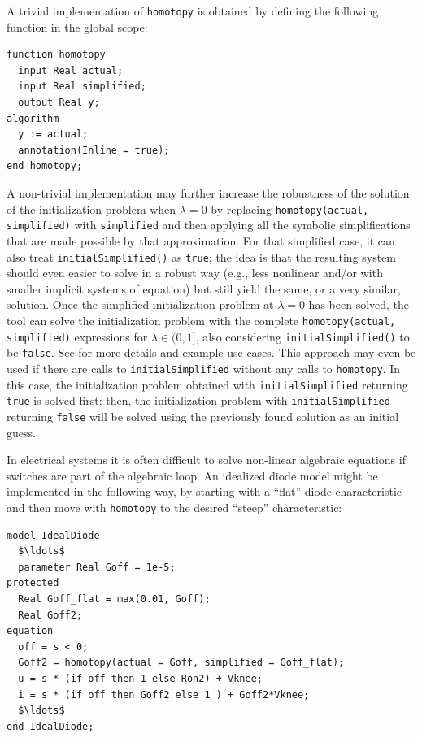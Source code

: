 \begin{nonnormative}
A trivial implementation of \lstinline!homotopy! is obtained by defining the following function in the global scope:
\begin{lstlisting}[language=modelica]
function homotopy
  input Real actual;
  input Real simplified;
  output Real y;
algorithm
  y := actual;
  annotation(Inline = true);
end homotopy;
\end{lstlisting}

A non-trivial implementation may further increase the robustness of the solution of the initialization problem when $\lambda=0$ by replacing \lstinline!homotopy(actual, simplified)! with \lstinline!simplified! and then applying all the symbolic simplifications that are made possible by that approximation.
For that simplified case, it can also treat \lstinline!initialSimplified()! as \lstinline!true!; the idea is that the resulting system should even easier to solve in a robust way (e.g., less nonlinear and/or with smaller implicit systems of equation) but still yield the same, or a very similar, solution.
Once the simplified initialization problem at $\lambda=0$ has been solved, the tool can solve the initialization problem with the complete \lstinline!homotopy(actual, simplified)! expressions for $\lambda \in (0,1]$, also considering \lstinline!initialSimplified()! to be \lstinline!false!.
See \textcite{CasellaEtAl2026InitialSimplified} for more details and example use cases.
This approach may even be used if there are calls to \lstinline!initialSimplified! without any calls to \lstinline!homotopy!.
In this case, the initialization problem obtained with \lstinline!initialSimplified! returning \lstinline!true! is solved first; then, the initialization problem with \lstinline!initialSimplified! returning \lstinline!false! will be solved using the previously found solution as an initial guess.
\end{nonnormative}

\begin{example}[1]
In electrical systems it is often difficult to solve non-linear algebraic equations if switches are part of the algebraic loop.
An idealized diode model might be implemented in the following way, by starting with a ``flat'' diode characteristic and then move with \lstinline!homotopy! to the desired ``steep'' characteristic:
\begin{lstlisting}[language=modelica]
model IdealDiode
  $\ldots$
  parameter Real Goff = 1e-5;
protected
  Real Goff_flat = max(0.01, Goff);
  Real Goff2;
equation
  off = s < 0;
  Goff2 = homotopy(actual = Goff, simplified = Goff_flat);
  u = s * (if off then 1 else Ron2) + Vknee;
  i = s * (if off then Goff2 else 1 ) + Goff2*Vknee;
  $\ldots$
end IdealDiode;
\end{lstlisting}
\end{example}

